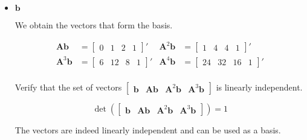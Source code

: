 \begin{itemize}
 \item $\mathbf{b}$

 We obtain the vectors that form the basis.

\begin{align*}
 \mathbf{Ab} &= \begin{bmatrix} 0 & 1 & 2 & 1 \end{bmatrix}'
 & \mathbf{A}^2\mathbf{b} &= \begin{bmatrix}
 1 & 4 & 4 &1
 \end{bmatrix}'\\
 \mathbf{A}^3\mathbf{b} &= \begin{bmatrix} 6 & 12 & 8 & 1 \end{bmatrix}'
 & \mathbf{A}^4\mathbf{b} &= \begin{bmatrix} 24 & 32 & 16 & 1 \end{bmatrix}'\\
\end{align*}

Verify that the set of vectors $\begin{bmatrix}
                                 \mathbf{b} & \mathbf{A} \mathbf{b} & \mathbf{A}^2 \mathbf{b} & \mathbf{A}^3 \mathbf{b}
                                \end{bmatrix}$
is linearly independent.

\begin{equation*}
 \det(\begin{bmatrix}
                                 \mathbf{b} & \mathbf{A} \mathbf{b} & \mathbf{A}^2 \mathbf{b} & \mathbf{A}^3 \mathbf{b}
                                \end{bmatrix}) = 1
\end{equation*}

The vectors are indeed linearly independent and can be used as a basis.


\end{itemize}
